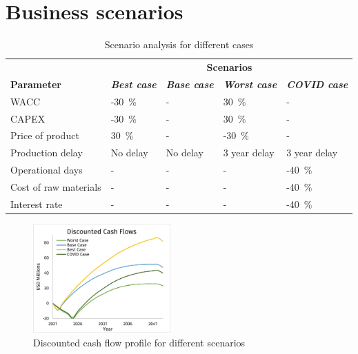 
\section{Business scenarios}

\begin{table}[H]
\centering
\caption{Scenario analysis for different cases}
\label{scenario_analysis}
\begin{tabular}{@{}l|llll@{}}
\toprule
                      & \multicolumn{4}{c}{\textbf{Scenarios}}                                                        \\
\textbf{Parameter}    & \textit{\textbf{Best case}} & \textit{\textbf{Base case}} & \textit{\textbf{Worst case}} & \textit{\textbf{COVID case}} \\ \midrule
WACC                  & -\SI{30}{\percent}                       & -                          & \SI{30}{\percent}                         & -                            \\
CAPEX                 & -\SI{30}{\percent}                       & -                          & \SI{30}{\percent}                         & -                            \\
Price of product      & \SI{30}{\percent}                        & -                          & -\SI{30}{\percent}                        & -                            \\
Production delay      & No delay                    & No delay                   & 3 year delay                 & 3 year delay                 \\
Operational days      & -                           & -                          & -                            & -\SI{40}{\percent}                        \\
Cost of raw materials & -                           & -                          & -                            & -\SI{40}{\percent}                        \\
Interest rate         & -                           & -                          & -                            & -\SI{40}{\percent}                        \\\bottomrule
\end{tabular}
\end{table}

\begin{figure}
    \caption{Discounted cash flow profile for different scenarios}
    \label{DCF_scenario}
    \includegraphics[width=0.47\textwidth]{chapters/6-economics/figures/DCF.jpg}
\end{figure}

